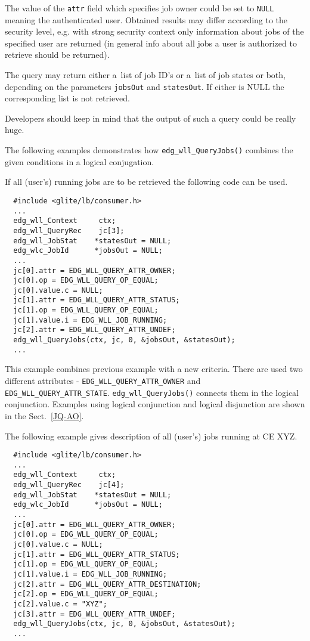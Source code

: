 The value of the \texttt{attr} field which specifies job owner
could be set to \texttt{NULL} meaning the authenticated user.
Obtained results may differ according to the security level, e.g. with strong security
context only information about jobs of the specified user are returned
(in general info about all jobs a user is authorized to retrieve should be
returned).

The query may return either a~list of job ID's or a~list of job states or both,
depending on the parameters \texttt{jobsOut} and \texttt{statesOut}.
If either is NULL the corresponding list is not retrieved.

Developers should keep in mind that the output of such a query could be really huge.
\par

The following examples demonstrates how \texttt{edg\_wll\_QueryJobs()} combines 
the given conditions in a logical conjugation.

\label{JQ-rj}

If all (user's) running jobs are to be retrieved the following code can
be used.
\begin{verbatim}
  #include <glite/lb/consumer.h>
  ...
  edg_wll_Context     ctx;    
  edg_wll_QueryRec    jc[3];
  edg_wll_JobStat    *statesOut = NULL;
  edg_wlc_JobId      *jobsOut = NULL;
  ...
  jc[0].attr = EDG_WLL_QUERY_ATTR_OWNER;
  jc[0].op = EDG_WLL_QUERY_OP_EQUAL;
  jc[0].value.c = NULL;
  jc[1].attr = EDG_WLL_QUERY_ATTR_STATUS;
  jc[1].op = EDG_WLL_QUERY_OP_EQUAL;
  jc[1].value.i = EDG_WLL_JOB_RUNNING;
  jc[2].attr = EDG_WLL_QUERY_ATTR_UNDEF;
  edg_wll_QueryJobs(ctx, jc, 0, &jobsOut, &statesOut);
  ...
\end{verbatim}

This example combines previous example with a new criteria. There are used two different attributes
 - \texttt{EDG\_WLL\_QUERY\_ATTR\_OWNER} and \texttt{EDG\_WLL\_QUERY\_ATTR\_STATE}.
\texttt{edg\_wll\_QueryJobs()} connects them in the logical conjunction.
Examples using logical conjunction and logical disjunction are shown in the Sect.~\ref{JQ-AO}.

The following example gives description of all (user's) jobs running at CE XYZ.
\begin{verbatim}
  #include <glite/lb/consumer.h>
  ...
  edg_wll_Context     ctx;    
  edg_wll_QueryRec    jc[4];
  edg_wll_JobStat    *statesOut = NULL;
  edg_wlc_JobId      *jobsOut = NULL;
  ...
  jc[0].attr = EDG_WLL_QUERY_ATTR_OWNER;
  jc[0].op = EDG_WLL_QUERY_OP_EQUAL;
  jc[0].value.c = NULL;
  jc[1].attr = EDG_WLL_QUERY_ATTR_STATUS;
  jc[1].op = EDG_WLL_QUERY_OP_EQUAL;
  jc[1].value.i = EDG_WLL_JOB_RUNNING;
  jc[2].attr = EDG_WLL_QUERY_ATTR_DESTINATION;
  jc[2].op = EDG_WLL_QUERY_OP_EQUAL;
  jc[2].value.c = "XYZ";
  jc[3].attr = EDG_WLL_QUERY_ATTR_UNDEF;
  edg_wll_QueryJobs(ctx, jc, 0, &jobsOut, &statesOut);
  ...
\end{verbatim}

